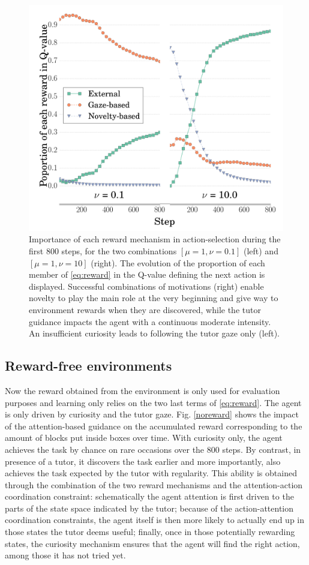 \documentclass[letterpaper, 10 pt, conference]{ieeeconf}  %
\begin{document}
\begin{figure}[t!]
\includegraphics[width=\linewidth]{prop.png}
\caption{Importance of each reward mechanism in action-selection during the first 800 steps, for the two combinations $[\mu=1,\nu=0.1]$ (left) and $[\mu=1, \nu=10]$ (right). The evolution of the proportion of each member of \eqref{eq:reward} in the Q-value defining the next action is displayed. Successful combinations of motivations (right) enable novelty to play the main role at the very beginning and give way to environment rewards when they are discovered, while the tutor guidance impacts the agent with a continuous moderate intensity. An insufficient curiosity leads to following the tutor gaze only (left).}
\label{fig:prop}
\end{figure}

 \subsection{Reward-free environments}

Now the reward obtained from the environment is only used for evaluation purposes and learning only relies on the two last terms of \ref{eq:reward}. The agent is only driven by curiosity and the tutor gaze. Fig. \ref{noreward} shows the impact of the attention-based guidance on the accumulated reward corresponding to the amount of blocks put inside boxes over time. With curiosity only, the agent achieves the task by chance on rare occasions over the 800 steps. By contrast, in presence of a tutor, it discovers the task earlier and more importantly, also achieves the task expected by the tutor with regularity. This ability is obtained through the combination of the two reward mechanisms and the attention-action coordination constraint: schematically the agent attention is first driven to the parts of the state space indicated by the tutor; because of the action-attention coordination constraints, the agent itself is then more likely to actually end up in those states the tutor deems useful; finally, once in those potentially rewarding states, the curiosity mechanism ensures that the agent will find the right action, among those it has not tried yet.
\end{document}
